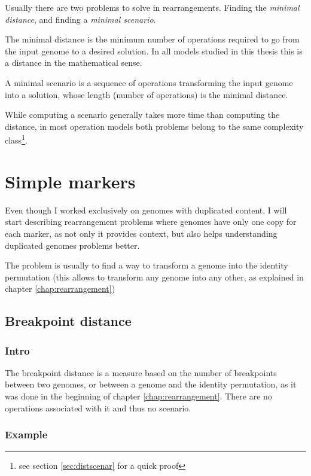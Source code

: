 \documentclass[11pt,final,twoside,nofrench]{thlifl}
\begin{document}
Usually there are two problems to solve in rearrangements. Finding the \emph{minimal distance}, and finding a \emph{minimal scenario}.

The minimal distance is the minimum number of operations required to go from the input genome to a desired solution. In all models studied in this thesis this is a distance in the mathematical sense.

A minimal scenario is a sequence of operations transforming the input genome into a solution, whose length (number of operations) is the minimal distance.

While computing a scenario generally takes more time than computing the distance, in most operation models both problems belong to the same complexity class\footnote{see section \ref{sec:distscenar} for a quick proof}.

\section{Simple markers}

Even though I worked exclusively on genomes with duplicated content, I will start describing rearrangement problems where genomes have only one copy for each marker, as not only it provides context, but also helps understanding duplicated genomes problems better.

The problem is usually to find a way to transform a genome into the identity permutation (this allows to transform any genome into any other, as explained in chapter \ref{chap:rearrangement})

\subsection{Breakpoint distance}

\subsubsection*{Intro}

The breakpoint distance is a measure based on the number of breakpoints between two genomes, or between a genome and the identity permutation, as it was done in the beginning of chapter \ref{chap:rearrangement}. There are no operations associated with it and thus no scenario.

\subsubsection*{Example}
\end{document}

